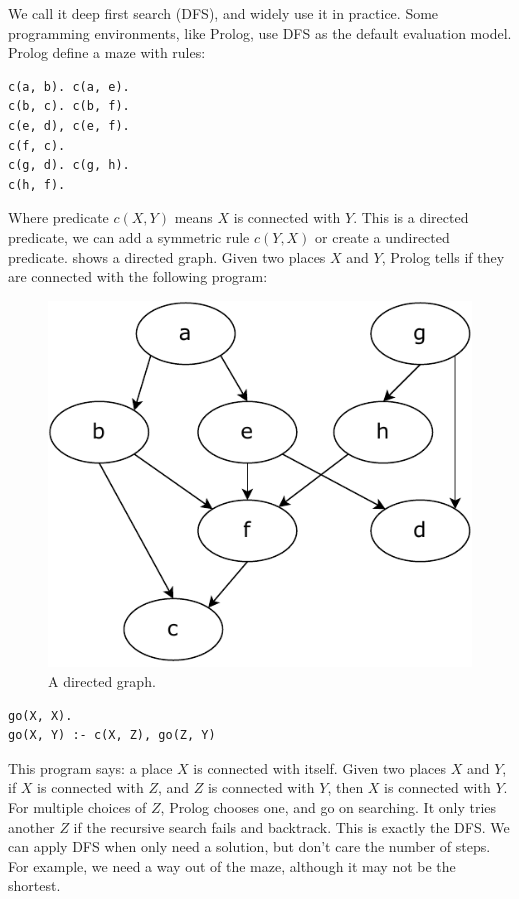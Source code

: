 \documentclass[b5paper]{article}
\begin{document}
We call it deep first search (DFS), and widely use it in practice. Some programming environments, like Prolog, use DFS as the default evaluation model. Prolog define a maze with rules:

\lstset{language=Prolog}
\begin{lstlisting}
c(a, b). c(a, e).
c(b, c). c(b, f).
c(e, d), c(e, f).
c(f, c).
c(g, d). c(g, h).
c(h, f).
\end{lstlisting}

Where predicate $c(X, Y)$ means $X$ is connected with $Y$. This is a directed predicate, we can add a symmetric rule $c(Y, X)$ or create a undirected predicate.  shows a directed graph. Given two places $X$ and $Y$, Prolog tells if they are connected with the following program:

\begin{figure}[htbp]
 \centering
 \includegraphics[scale=0.6]{img/directed-graph}
 \caption{A directed graph.}
 \label{fig:directed-graph}
\end{figure}

\lstset{language=Prolog}
\begin{lstlisting}
go(X, X).
go(X, Y) :- c(X, Z), go(Z, Y)
\end{lstlisting}

This program says: a place $X$ is connected with itself. Given two places $X$ and $Y$, if $X$ is connected with $Z$, and $Z$ is connected with $Y$, then $X$ is connected with $Y$. For multiple choices of $Z$, Prolog chooses one, and go on searching. It only tries another $Z$ if the recursive search fails and backtrack. This is exactly the DFS. We can apply DFS when only need a solution, but don't care the number of steps. For example, we need a way out of the maze, although it may not be the shortest.
\end{document}

